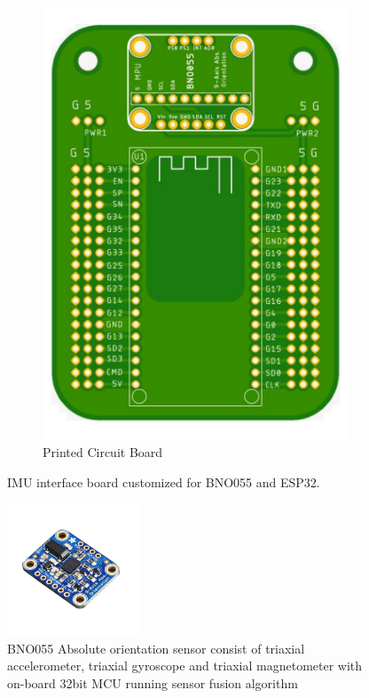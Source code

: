 \begin{figure}[ht]
\begin{subfigure}[b]{0.4\textwidth}
         \includegraphics[width=\textwidth]{figures/Electronics/intefecePCB.pdf}
         \caption{Printed Circuit Board}
         \label{fig:intefecePCB}
     \end{subfigure}
    \caption{IMU interface board customized for BNO055 and ESP32. }
    \label{fig:intefeceIMU}
\end{figure}

\begin{figure}[ht]
    \centering
    \includegraphics[width=0.35\textwidth]{figures/Assembly/bno055.pdf}
    \caption{BNO055 Absolute orientation sensor consist of triaxial accelerometer, triaxial gyroscope and triaxial magnetometer with on-board 32bit MCU running sensor fusion algorithm}
    \label{fig:BNO}
\end{figure}

